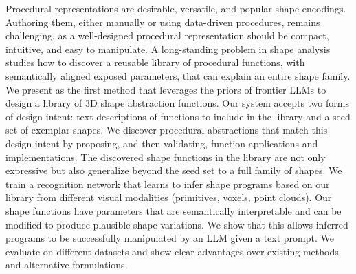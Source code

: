 

Procedural representations are desirable, versatile, and popular shape encodings. 
Authoring them, either manually or using data-driven procedures, remains challenging, as a well-designed procedural representation should be compact, intuitive, and easy to manipulate. 
A long-standing problem in shape analysis studies how to discover a reusable library of procedural functions, with semantically aligned exposed parameters, that can explain an entire shape family.
We present \methodname as the first method that leverages the
priors of frontier LLMs
to 
design a library of 3D shape abstraction functions.
Our system accepts two forms of design intent: 
text descriptions of functions to include in the library
and a seed set of exemplar shapes.
We discover procedural abstractions that match this design intent by proposing, and then validating, function applications and implementations.
The discovered shape functions in the library are not only expressive but also generalize beyond the seed set to a full family of shapes. 
We train a recognition network that learns to infer shape programs based on our library from different visual modalities (primitives, voxels, point clouds).
Our shape functions have parameters that are semantically interpretable and can be modified to produce plausible shape variations.
We show that this allows inferred programs to be successfully manipulated by an LLM given a text prompt. 
We evaluate \methodname on different datasets and show clear advantages over existing methods and alternative formulations.
